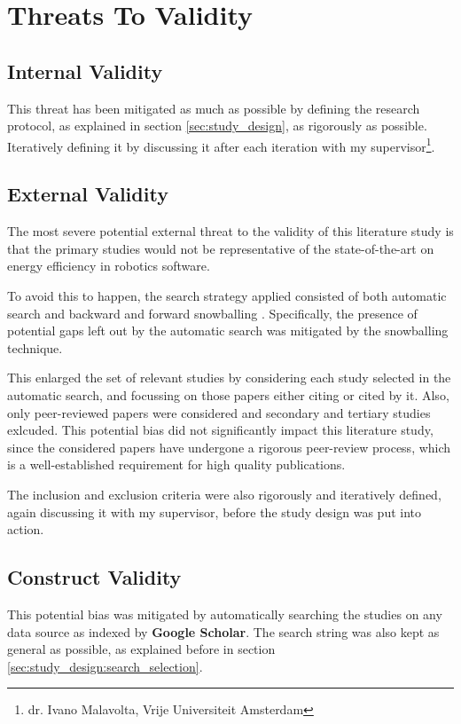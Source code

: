 \section{Threats To Validity}\label{sec:threats}
\subsection{Internal Validity}
This threat has been mitigated as much as possible by defining the research protocol, as explained in section \ref{sec:study_design}, 
as rigorously as possible.
Iteratively defining it by discussing it after each iteration with my supervisor\footnote{dr. Ivano Malavolta, Vrije Universiteit Amsterdam}.

\subsection{External Validity}
The most severe potential external threat to the validity of this literature study is that the primary studies would not 
be representative of the state-of-the-art on energy efficiency in robotics software.

To avoid this to happen, the search strategy applied consisted of both automatic search and backward and forward snowballing 
\cite{wohlin2014snowballing}. Specifically, the presence of potential gaps left out by the automatic search was mitigated by 
the snowballing technique. 

This enlarged the set of relevant studies by considering each study selected in the automatic search, 
and focussing on those papers either citing or cited by it. 
Also, only peer-reviewed papers were considered and secondary and tertiary studies exlcuded.
This potential bias did not significantly impact this literature study, since the considered papers have undergone a rigorous
peer-review process, which is a well-established requirement for high quality publications. 

The inclusion and exclusion criteria were also rigorously and iteratively defined, again discussing it with my supervisor,
before the study design was put into action.

\subsection{Construct Validity}
This potential bias was mitigated by automatically searching the studies on any data source as indexed by \textbf{Google Scholar}.
The search string was also kept as general as possible, as explained before in section \ref{sec:study_design:search_selection}.

